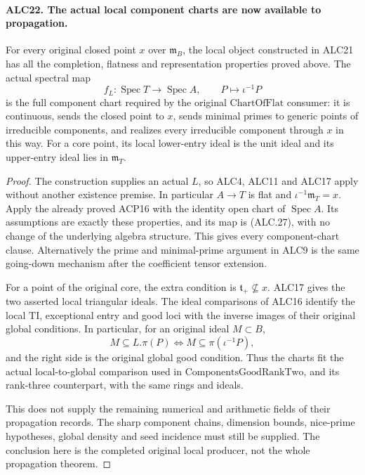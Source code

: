 \paragraph{ALC22. The actual local component charts are now available to propagation.}
\label{claim:ALC22}
For every original closed point \(x\) over
\(\mathfrak m_B\), the local object constructed in ALC21
has all the completion, flatness and representation properties
proved above.  The actual spectral map
\[
       f_L:\operatorname{Spec}T\longrightarrow\operatorname{Spec}A,
                     \qquad P\longmapsto\iota^{-1}P
                                                        \tag{ALC.27}
\]
is the full component chart required by the original
\(\mathrm{ChartOfFlat}\) consumer: it is continuous,
sends the closed point to \(x\), sends minimal primes to
generic points of irreducible components, and realizes every
irreducible component through \(x\) in this way.  For a
core point, its local lower-entry ideal is the unit ideal
and its upper-entry ideal lies in \(\mathfrak m_T\).

\begin{proof}
The construction supplies an actual \(L\), so ALC4,
ALC11 and ALC17 apply without another existence premise.
In particular \(A\to T\) is flat and
\(\iota^{-1}\mathfrak m_T=x\).  Apply the already
proved ACP16 with the identity open chart of
\(\operatorname{Spec}A\).  Its assumptions are exactly
these properties, and its map is (ALC.27), with no change
of the underlying algebra structure.  This gives every
component-chart clause.  Alternatively the prime and
minimal-prime argument in ALC9 is the same going-down
mechanism after the coefficient tensor extension.

For a point of the original core, the extra condition is
\(\mathfrak t_+\not\subseteq x\).  ALC17 gives the
two asserted local triangular ideals.  The ideal comparisons
of ALC16 identify the local \(\mathrm{TI}\), exceptional
entry and good loci with the inverse images of their
original global conditions.  In particular, for an original
ideal \(M\subset B\),
\[
          M\subseteq L.\pi(P)
             \Longleftrightarrow
          M\subseteq\pi(\iota^{-1}P),
                                                        \tag{ALC.28}
\]
and the right side is the original global good condition.
Thus the charts fit the actual local-to-global comparison
used in \(\mathrm{ComponentsGoodRankTwo}\), and its
rank-three counterpart, with the same rings and ideals.

This does not supply the remaining numerical and arithmetic
fields of their propagation records.  The sharp component
chains, dimension bounds, nice-prime hypotheses, global
density and seed incidence must still be supplied.  The
conclusion here is the completed original local producer,
not the whole propagation theorem.
\end{proof}

